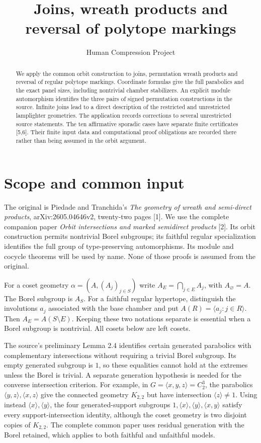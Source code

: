 
\title{Joins, wreath products and reversal of polytope markings}
\author{Human Compression Project}\date{}
\maketitle
\begin{abstract}
We apply the common orbit construction to joins, permutation wreath products
and reversal of regular polytope markings. Coordinate formulas give the full
parabolics and the exact panel sizes, including nontrivial chamber
stabilizers. An explicit module automorphism identifies the three pairs of
signed permutation constructions in the source. Infinite joins lead to a
direct description of the restricted and unrestricted lamplighter geometries.
The application records corrections to several unrestricted source statements.
The ten affirmative sporadic cases have separate finite certificates [5,6].
Their finite input data and computational proof obligations are recorded
there rather than being assumed in the orbit argument.
\end{abstract}

\section{Scope and common input}
The original is Piedade and Tranchida's \emph{The geometry of wreath and
semi-direct products}, arXiv:2605.04646v2, twenty-two pages [1]. We use
the complete companion paper \emph{Orbit intersections and marked semidirect
products} [2]. Its orbit construction permits nontrivial Borel subgroups;
its faithful regular specialization identifies the full group of
type-preserving automorphisms. Its module and cocycle theorems will be used
by name. None of those proofs is assumed from the original.

For a coset geometry $\alpha=(A,(A_j)_{j\in S})$ write
$A_E=\bigcap_{j\in E}A_j$, with $A_\varnothing=A$. The Borel subgroup
is $A_S$. For a faithful regular hypertope, distinguish the involutions
$a_j$ associated with the base chamber and put
$A(R)=\langle a_j:j\in R\rangle$. Then $A_E=A(S\setminus E)$.
Keeping these two notations separate is essential when a Borel subgroup
is nontrivial. All cosets below are left cosets.

The source's preliminary Lemma 2.4 identifies certain generated
parabolics with complementary intersections without requiring a trivial
Borel subgroup. Its empty generated subgroup is $1$, so these equalities
cannot hold at the extremes unless the Borel is trivial. A separate
generation hypothesis is needed for the converse intersection criterion.
For example, in $G=\langle x,y,z\rangle=C_2^3$, the parabolics
$\langle y,z\rangle,\langle x,z\rangle$ give the connected geometry
$K_{2,2}$ but have intersection $\langle z\rangle\ne1$. Using instead
$\langle x\rangle,\langle y\rangle$, the four generated-support
subgroups $1,\langle x\rangle,\langle y\rangle,\langle x,y\rangle$
satisfy every support-intersection identity, although the coset geometry
is two disjoint copies of $K_{2,2}$. The complete common paper uses
residual generation with the Borel retained, which applies to both faithful
and unfaithful models.

